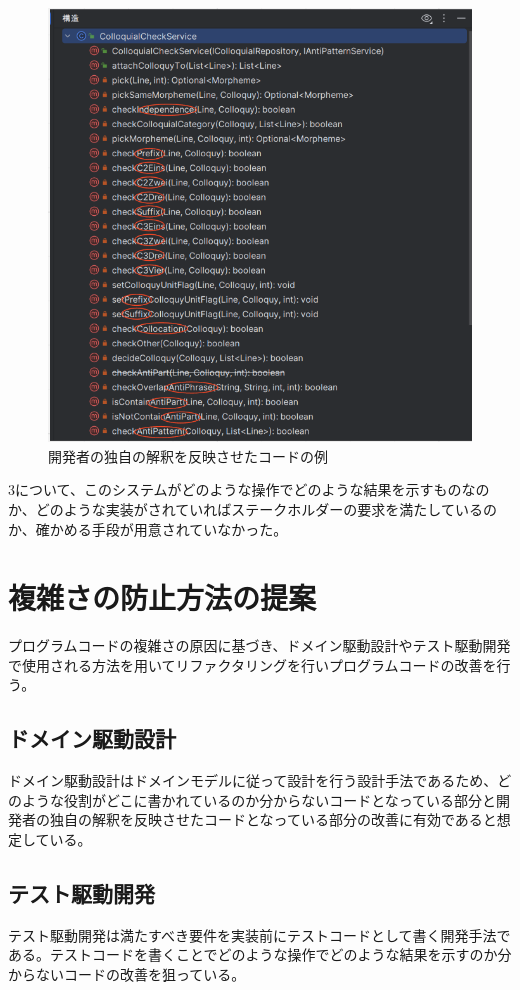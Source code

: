 \documentclass[11pt, a4paper]{jreport}
\begin{document}
\begin{figure}[H]
\centering
\includegraphics[width=1\linewidth]{image/genin2.1.png}
\caption{開発者の独自の解釈を反映させたコードの例}
\label{fig:enter-label}
\end{figure}
3について、このシステムがどのような操作でどのような結果を示すものなのか、どのような実装がされていればステークホルダーの要求を満たしているのか、確かめる手段が用意されていなかった。
\section{複雑さの防止方法の提案}
プログラムコードの複雑さの原因に基づき、ドメイン駆動設計やテスト駆動開発で使用される方法を用いてリファクタリングを行いプログラムコードの改善を行う。
\subsection{ドメイン駆動設計}
ドメイン駆動設計はドメインモデルに従って設計を行う設計手法であるため、どのような役割がどこに書かれているのか分からないコードとなっている部分と開発者の独自の解釈を反映させたコードとなっている部分の改善に有効であると想定している。
\subsection{テスト駆動開発}
テスト駆動開発は満たすべき要件を実装前にテストコードとして書く開発手法である。テストコードを書くことでどのような操作でどのような結果を示すのか分からないコードの改善を狙っている。
\end{document}
